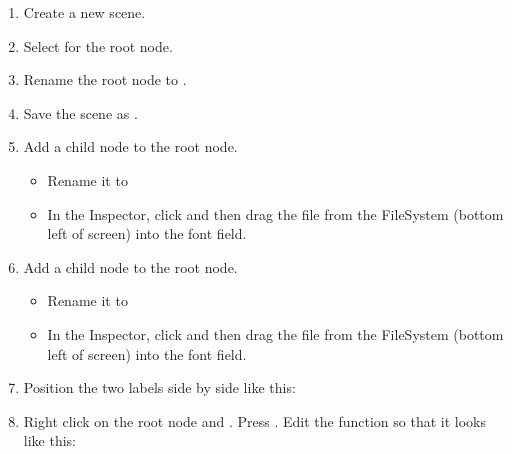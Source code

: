 \documentclass[a4paper,12pt,english]{sphinxmanual}
\begin{document}
\label{\detokenize{tutorial:displaying-the-high-score-table}}\begin{enumerate}
%
\item {} 
\sphinxAtStartPar
Create a new scene.

\item {} 
\sphinxAtStartPar
Select  for the root node.

\item {} 
\sphinxAtStartPar
Rename the root node to .

\item {} 
\sphinxAtStartPar
Save the scene as .

\item {} 
\sphinxAtStartPar
Add a  child node to the root node.
\begin{itemize}
\item {} 
\sphinxAtStartPar
Rename it to 

\item {} 
\sphinxAtStartPar
In the Inspector, click  and then drag the
 file from the FileSystem (bottom left of screen)
into the \sphinxstylestrong{{[}empty{]}} font field.

\end{itemize}

\item {} 
\sphinxAtStartPar
Add a  child node to the root node.
\begin{itemize}
\item {} 
\sphinxAtStartPar
Rename it to 

\item {} 
\sphinxAtStartPar
In the Inspector, click  and then drag the
 file from the FileSystem (bottom left of screen)
into the \sphinxstylestrong{{[}empty{]}} font field.

\end{itemize}

\item {} 
\sphinxAtStartPar
Position the two labels side by side like this:

\sphinxAtStartPar
{} 

\item {} 
\sphinxAtStartPar
Right click on the root node and . Press .
Edit the  function so that it looks like this:

\end{enumerate}
\end{document}
